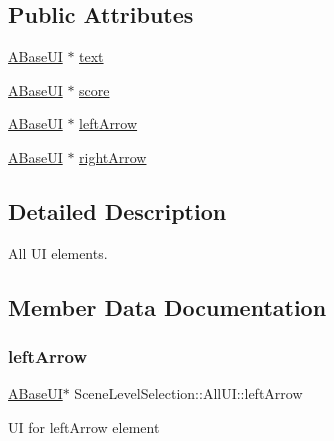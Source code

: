 \subsection*{Public Attributes}
\begin{DoxyCompactItemize}
\item 
\hyperlink{class_a_base_u_i}{A\+Base\+UI} $\ast$ \hyperlink{struct_scene_level_selection_1_1_all_u_i_ad2d0b933a964466a4a007a485f8e08aa}{text}
\item 
\hyperlink{class_a_base_u_i}{A\+Base\+UI} $\ast$ \hyperlink{struct_scene_level_selection_1_1_all_u_i_a56609f362dab95f3b13aa649e1c86004}{score}
\item 
\hyperlink{class_a_base_u_i}{A\+Base\+UI} $\ast$ \hyperlink{struct_scene_level_selection_1_1_all_u_i_a9368995814a5c08871309e9a38765a6e}{left\+Arrow}
\item 
\hyperlink{class_a_base_u_i}{A\+Base\+UI} $\ast$ \hyperlink{struct_scene_level_selection_1_1_all_u_i_abdef1035e3e42b604196d33ae6b4e04a}{right\+Arrow}
\end{DoxyCompactItemize}


\subsection{Detailed Description}
All UI elements. 

\subsection{Member Data Documentation}
\mbox{\label{struct_scene_level_selection_1_1_all_u_i_a9368995814a5c08871309e9a38765a6e}} 
\subsubsection{\texorpdfstring{left\+Arrow}{leftArrow}}
{\footnotesize\ttfamily \hyperlink{class_a_base_u_i}{A\+Base\+UI}$\ast$ Scene\+Level\+Selection\+::\+All\+U\+I\+::left\+Arrow}

UI for left\+Arrow element \mbox{\label{struct_scene_level_selection_1_1_all_u_i_abdef1035e3e42b604196d33ae6b4e04a}} 
